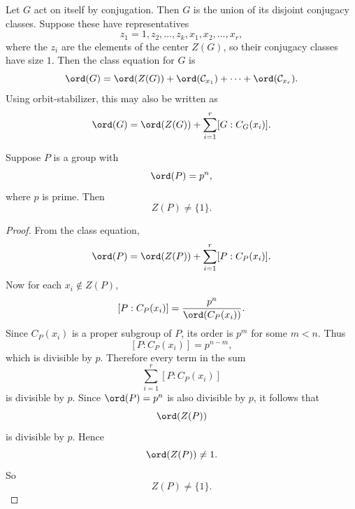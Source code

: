 \begin{definition}
    Let $G$ act on itself by conjugation.
    Then $G$ is the union of its disjoint conjugacy classes.
    Suppose these have representatives
    \[
        z_1=1,z_2,\ldots,z_k,x_1,x_2,\ldots,x_r,
    \]
    where the $z_i$ are the elements of the center $Z(G)$, so their conjugacy classes have size $1$.
    Then the class equation for $G$ is
    \[
        \ord(G)=\ord(Z(G))+\ord(\mathcal{C}_{x_1})+\cdots+\ord(\mathcal{C}_{x_r}).
    \]
    Using orbit-stabilizer, this may also be written as
    \[
        \ord(G)=\ord(Z(G))+\sum_{i=1}^r [G:C_G(x_i)].
    \]
\end{definition}

\begin{example}
    Suppose $P$ is a group with
    \[
        \ord(P)=p^n,
    \]
    where $p$ is prime.
    Then
    \[
        Z(P)\neq \{1\}.
    \]
\end{example}

\begin{proof}
    From the class equation,
    \[
        \ord(P)=\ord(Z(P))+\sum_{i=1}^r [P:C_P(x_i)].
    \]
    Now for each $x_i\notin Z(P)$,
    \[
        [P:C_P(x_i)] = \frac{p^n}{\ord(C_P(x_i))}.
    \]
    Since $C_P(x_i)$ is a proper subgroup of $P$, its order is $p^m$ for some $m<n$.
    Thus
    \[
        [P:C_P(x_i)]=p^{n-m},
    \]
    which is divisible by $p$.
    Therefore every term in the sum
    \[
        \sum_{i=1}^r [P:C_P(x_i)]
    \]
    is divisible by $p$.
    Since $\ord(P)=p^n$ is also divisible by $p$, it follows that
    \[
        \ord(Z(P))
    \]
    is divisible by $p$.
    Hence
    \[
        \ord(Z(P))\neq 1.
    \]
    So
    \[
        Z(P)\neq \{1\}.
    \]
\end{proof}